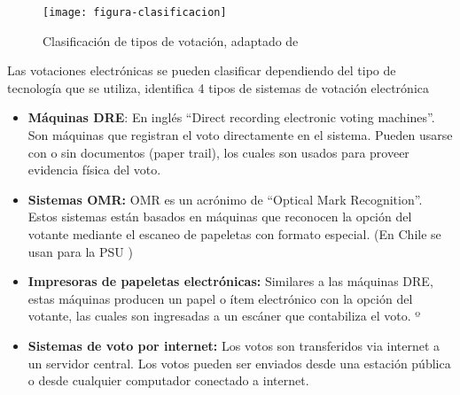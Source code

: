\begin{figure}[h!]
	\centering
	\texttt{[image: figura-clasificacion]}
	\caption[Clasificación de tipos de votación]{Clasificación de tipos de votación, adaptado de \cite{Kosmopoulos2004}}
	\label{fig:tipos-votacion}
\end{figure}
\bigskip

Las votaciones electrónicas se pueden clasificar dependiendo del tipo de tecnología 
que se utiliza, \cite{InternationalInstituteforDemocracyandElectoralAssistance2011} 
identifica 4 tipos de sistemas de votación electrónica

\begin{itemize}
	\item \textbf{Máquinas DRE}: En inglés ``Direct recording electronic voting machines''. Son máquinas que 
	registran el voto directamente en el sistema. Pueden usarse con o sin documentos (paper trail),
	 los cuales son usados para proveer evidencia física del voto.
	
	\item \textbf{Sistemas OMR:} OMR es un acrónimo de ``Optical Mark Recognition''. Estos sistemas están basados en 
	máquinas que reconocen la opción del votante mediante el escaneo de papeletas con formato especial. (En Chile se usan
	para la PSU )
	
	\item \textbf{Impresoras de papeletas electrónicas:} Similares a las máquinas DRE, estas máquinas producen un papel o ítem
	electrónico con la opción del votante, las cuales son ingresadas a un escáner que contabiliza el voto.
	º
	\item \textbf{Sistemas de voto por internet:} Los votos son transferidos via internet a un servidor central. Los votos pueden 
	ser enviados desde una estación pública o desde cualquier computador conectado a internet.
	
\end{itemize}






